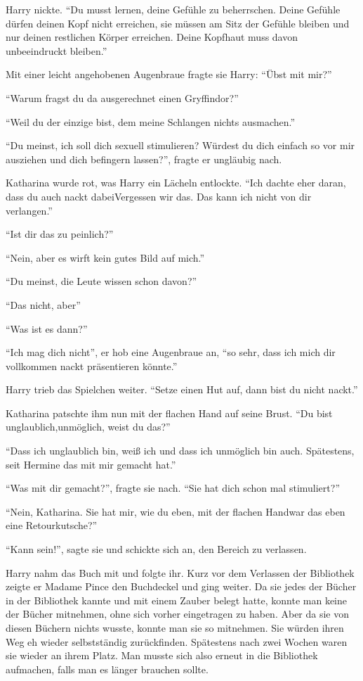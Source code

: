 Harry nickte. \enquote{Du musst lernen, deine Gefühle zu beherrschen. Deine Gefühle dürfen deinen Kopf nicht erreichen, sie müssen am Sitz der Gefühle bleiben und nur deinen restlichen Körper erreichen. Deine Kopfhaut muss davon unbeeindruckt bleiben.}

Mit einer leicht angehobenen Augenbraue fragte sie Harry: \enquote{Übst  mit mir?}

\enquote{Warum fragst du da ausgerechnet einen Gryffindor?}

\enquote{Weil du der einzige bist, dem meine Schlangen nichts ausmachen.}

\enquote{Du meinst, ich soll dich sexuell stimulieren? Würdest du dich einfach so vor mir ausziehen und dich befingern lassen?}, fragte er ungläubig nach.

Katharina wurde rot, was Harry ein Lächeln entlockte. \enquote{Ich dachte eher daran, dass du auch nackt dabei\abs Vergessen wir das. Das kann ich nicht von dir verlangen.}

\enquote{Ist dir das zu peinlich?}

\enquote{Nein, aber es wirft kein gutes Bild auf mich.}

\enquote{Du meinst, die Leute wissen schon davon?}

\enquote{Das nicht, aber\abs}

\enquote{Was ist es dann?}

\enquote{Ich mag dich nicht}, er hob eine Augenbraue an, \enquote{so sehr, dass ich mich dir vollkommen nackt präsentieren könnte.}

Harry trieb das Spielchen weiter. \enquote{Setze einen Hut auf, dann bist du nicht nackt.}

Katharina patschte ihm nun mit der flachen Hand auf seine Brust. \enquote{Du bist unglaublich,\abs unmöglich, weist du das?}

\enquote{Dass ich unglaublich bin, weiß ich und dass ich unmöglich bin auch. Spätestens, seit Hermine das mit mir gemacht hat.}

\enquote{Was mit dir gemacht?}, fragte sie nach. \enquote{Sie hat dich schon mal stimuliert?}

\enquote{Nein, Katharina. Sie hat mir, wie du eben, mit der flachen Hand\abs war das eben eine Retourkutsche?}

\enquote{Kann sein!}, sagte sie und schickte sich an, den Bereich zu verlassen.

Harry nahm das Buch mit und folgte ihr. Kurz vor dem Verlassen der Bibliothek zeigte er Madame Pince den Buchdeckel und ging weiter. Da sie jedes der Bücher in der Bibliothek kannte und mit einem Zauber belegt hatte, konnte man keine der Bücher mitnehmen, ohne sich vorher eingetragen zu haben. Aber da sie von diesen Büchern nichts wusste, konnte man sie so mitnehmen. Sie würden ihren Weg eh wieder selbstständig zurückfinden. Spätestens nach zwei Wochen waren sie wieder an ihrem Platz. Man musste sich also erneut in die Bibliothek aufmachen, falls man es länger brauchen sollte.

